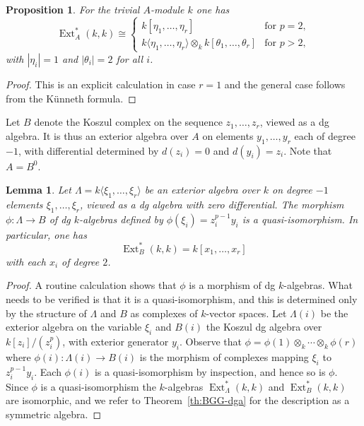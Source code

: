 \documentclass{amsart}[a4]
\newtheorem{lemma}[theorem]{Lemma}
\newtheorem{proposition}[theorem]{Proposition}
\theoremstyle{definition}
\theoremstyle{remark}
\numberwithin{equation}{section}
\newcommand{\Ext}{\operatorname{Ext}}
\let\Lambda\varLambda
\begin{document}
\begin{proposition}
  For the trivial $A$-module $k$ one has
  \begin{equation}\label{eq:ext-algebra}
    \Ext^*_A(k,k)\cong\begin{cases} k[\eta_1,\ldots,\eta_r]&\text{for }p=2,\\
      k\langle\eta_1,\ldots,\eta_r\rangle\otimes_k
      k[\theta_1,\ldots,\theta_r]&\text{for }p>2,
    \end{cases}
    \end{equation}
  with  $|\eta_i|=1$ and $|\theta_i|=2$ for all $i$.
\end{proposition}
\begin{proof}
  This is an explicit calculation in case $r=1$ and the general case
  follows from the Künneth formula.
\end{proof}

Let $B$ denote the Koszul complex on the sequence $z_1,\ldots,z_r$,
viewed as a dg algebra. It is thus an exterior algebra over $A$ on elements
$y_1,\ldots,y_r$  each of degree $-1$, with diﬀerential determined by
$d(z_i) = 0$ and $d(y_i) = z_i$. Note that $A=B^0$.

\begin{lemma}\label{le:ext-alg-qis}
  Let $\Lambda= k\langle\xi_1,\ldots,\xi_r\rangle$ be an exterior
  algebra over $k$ on degree $-1$ elements $\xi_1,\ldots,\xi_r$,
  viewed as a dg algebra with zero diﬀerential. The morphism
  $\phi\colon\Lambda\to B$ of dg $k$-algebras defined by
  $\phi(\xi_i)= z_i^{p-1}y_i$ is a quasi-isomorphism.  In particular,
  one has \[\Ext^*_B(k,k)=k[x_1,\ldots,x_r]\] with each $x_i$ of degree $2$.
\end{lemma}

\begin{proof}
  A routine calculation shows that $\phi$ is a morphism of dg
  $k$-algebras.  What needs to be verified is that it is a
  quasi-isomorphism, and this is determined only by the structure of
  $\Lambda$ and $B$ as complexes of $k$-vector spaces.  Let
  $\Lambda(i)$ be the exterior algebra on the variable $\xi_i$ and
  $B(i)$ the Koszul dg algebra over $k[z_i]/(z_i^p)$, with exterior
  generator $y_i$. Observe that
  $\phi= \phi(1)\otimes_k \cdots\otimes_k\phi(r)$ where
  $\phi(i)\colon\Lambda(i)\to B(i)$ is the morphism of complexes
  mapping $\xi_i$ to $z_i^{p-1}y_i$. Each $\phi(i)$ is a quasi-isomorphism by
  inspection, and hence so is $\phi$.  Since $\phi$ is a quasi-isomorphism the
  $k$-algebras $\Ext^*_\Lambda(k,k)$ and $\Ext^*_B(k,k)$ are
  isomorphic, and we refer to Theorem~\ref{th:BGG-dga} for the
  description as a symmetric algebra.
\end{proof}
\end{document}
